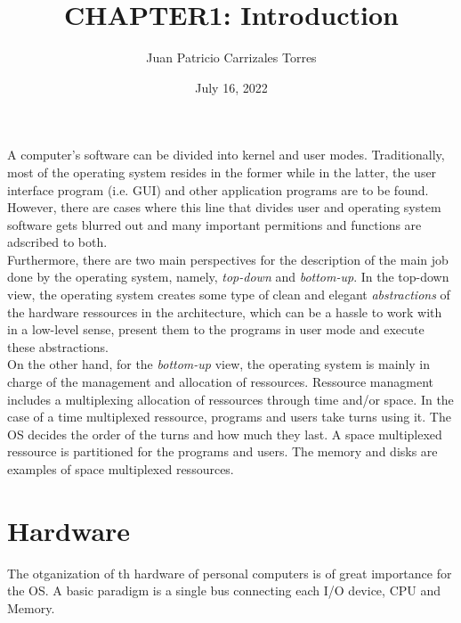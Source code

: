 \documentclass[12pt]{article}
\begin{document}
  
 \title{CHAPTER1: Introduction}
   \author{Juan Patricio Carrizales Torres}
     \date{July 16, 2022}
       \maketitle
       A computer's software can be divided into kernel and user modes. Traditionally, most of the operating system resides in the former while in the latter, the user interface program (i.e. GUI) and other application programs are to be found. However, there are cases where this line that divides user and operating system software gets blurred out and many important permitions and functions are adscribed to both.\\
       Furthermore, there are two main perspectives for the description of the main job done by the operating system, namely, \textit{top-down} and \textit{bottom-up}. In the top-down view, the operating system creates some type of clean and elegant \textit{abstractions} of the hardware ressources in the architecture, which can be a hassle to work with in a low-level sense, present them to the programs in user mode and execute these abstractions.\\
       On the other hand, for the \textit{bottom-up} view, the operating system is mainly in charge of the management and allocation of ressources. Ressource managment includes a  multiplexing allocation of ressources through time and/or space. In the case of a time multiplexed ressource, programs and users take turns using it. The OS decides the order of the turns and how much they last. A space multiplexed ressource is partitioned for the programs and users. The memory and disks are examples of space multiplexed ressources.
       \section{Hardware}
       The otganization of th hardware of personal computers is of great importance for the OS. A basic paradigm is a single bus connecting each I/O device, CPU and Memory.
\end{document}
